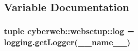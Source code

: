 \subsection{\-Variable \-Documentation}
\hypertarget{namespacecyberweb_1_1websetup_a3d8f69c03c8e14feec3c1b30c1f4a053}{
\subsubsection[{log}]{\setlength{\rightskip}{0pt plus 5cm}tuple {\bf cyberweb\-::websetup\-::log} = logging.\-get\-Logger(\-\_\-\-\_\-name\-\_\-\-\_\-)}}\label{namespacecyberweb_1_1websetup_a3d8f69c03c8e14feec3c1b30c1f4a053}

